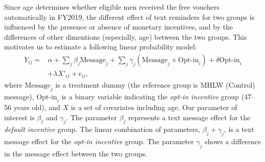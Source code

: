 \documentclass[
]{article}
\begin{document}
Since age determines whether eligible men received the free vouchers automatically in FY2019, the different effect of text reminders for two groups is influenced by the presence or absence of monetary incentives, and by the differences of other dimentions (especially, age) between the two groups. This motivates us to estimate a following linear probability model:
\begin{equation}
\begin{split}
Y_{ij} = &\alpha + \sum_j \beta_j \text{Message}_j + \sum_j \gamma_j (\text{Message}_j \times \text{Opt-in}_i) + \delta \text{Opt-in}_i \\
&+ \lambda X'_{ij} + \epsilon_{ij},
\end{split} \label{eq:regression}
\end{equation}
where \(\text{Message}_j\) is a treatment dummy (the reference group is MHLW (Control) message), \(\text{Opt-in}_i\) is a binary variable indicating the \emph{opt-in incentive} group (47--56 years old), and \(X\) is a set of covariates including age. Our parameter of interest is \(\beta_j\) and \(\gamma_j\). The parameter \(\beta_j\) represents a text message effect for the \emph{default incentive} group. The linear combination of parameters, \(\beta_j + \gamma_j\), is a text message effect for the \emph{opt-in incentive} group. The parameter \(\gamma_j\) shows a difference in the message effect between the two groups.
\end{document}
